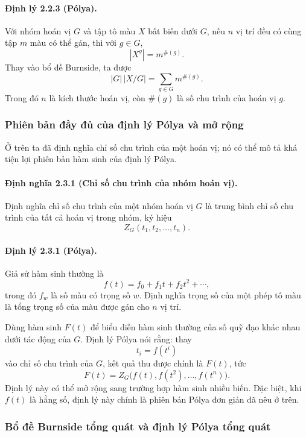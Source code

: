 \documentclass[11pt]{article}
\begin{document}
\paragraph{Định lý 2.2.3 (Pólya).}
Với nhóm hoán vị \(G\) và tập tô màu \(X\) bất biến dưới \(G\), nếu \(n\) vị
trí đều có cùng tập \(m\) màu có thể gán, thì với \(g\in G\),
\[
  |X^g|=m^{\#(g)}.
\]
Thay vào bổ đề Burnside, ta được
\[
  |G|\,|X/G|=\sum_{g\in G}m^{\#(g)}.
\]
Trong đó \(n\) là kích thước hoán vị, còn \(\#(g)\) là số chu trình của hoán vị
\(g\).

\subsubsection{Phiên bản đầy đủ của định lý Pólya và mở rộng}

Ở trên ta đã định nghĩa chỉ số chu trình của một hoán vị; nó có thể mô tả khá
tiện lợi phiên bản hàm sinh của định lý Pólya.

\paragraph{Định nghĩa 2.3.1 (Chỉ số chu trình của nhóm hoán vị).}
Định nghĩa chỉ số chu trình của một nhóm hoán vị \(G\) là trung bình chỉ số chu
trình của tất cả hoán vị trong nhóm, ký hiệu
\[
  Z_G(t_1,t_2,\ldots,t_n).
\]

\paragraph{Định lý 2.3.1 (Pólya).}
Giả sử hàm sinh thường là
\[
  f(t)=f_0+f_1t+f_2t^2+\cdots,
\]
trong đó \(f_w\) là số màu có trọng số \(w\). Định nghĩa trọng số của một phép
tô màu là tổng trọng số của màu được gán cho \(n\) vị trí.

Dùng hàm sinh \(F(t)\) để biểu diễn hàm sinh thường của số quỹ đạo khác nhau
dưới tác động của \(G\). Định lý Pólya nói rằng: thay
\[
  t_i=f(t^i)
\]
vào chỉ số chu trình của \(G\), kết quả thu được chính là \(F(t)\), tức
\[
  F(t)=Z_G\bigl(f(t),f(t^2),\ldots,f(t^n)\bigr).
\]
Định lý này có thể mở rộng sang trường hợp hàm sinh nhiều biến. Đặc biệt, khi
\(f(t)\) là hằng số, định lý này chính là phiên bản Pólya đơn giản đã nêu ở
trên.

\subsubsection{Bổ đề Burnside tổng quát và định lý Pólya tổng quát}
\end{document}
